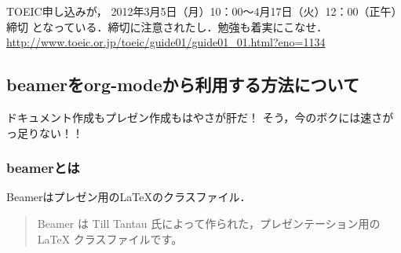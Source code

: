 \documentclass[11pt]{article}
\begin{document}
TOEIC申し込みが，
2012年3月5日（月）10：00～4月17日（火）12：00（正午）締切 
となっている．締切に注意されたし．勉強も着実にこなせ．\\

\href{http://www.toeic.or.jp/toeic/guide01/guide01_01.html?eno=1134}{http://www.toeic.or.jp/toeic/guide01/guide01\_01.html?eno=1134}
\subsection{beamerをorg-modeから利用する方法について}
\label{sec-6-3}

ドキュメント作成もプレゼン作成もはやさが肝だ！
そう，今のボクには速さがっ足りない！！
\subsubsection{beamerとは}
\label{sec-6-3-1}

Beamerはプレゼン用の\LaTeX{}のクラスファイル．

\begin{quote}
Beamer は Till Tantau 氏によって作られた，プレゼンテーション用の \LaTeX{} クラスファイルです。
\end{quote}
\end{document}
